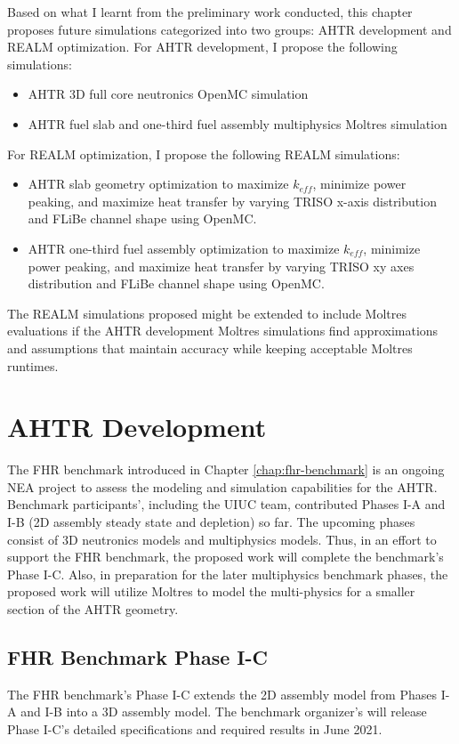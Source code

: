 Based on what I learnt from the preliminary work conducted, this chapter proposes 
future simulations categorized into two groups: \gls{AHTR} development and 
\gls{REALM} optimization. 
For \gls{AHTR} development, I propose the following simulations: 
\begin{itemize}
    \item \gls{AHTR} 3D full core neutronics OpenMC simulation
    \item \gls{AHTR} fuel slab and one-third fuel assembly multiphysics 
    Moltres simulation
\end{itemize}
For \gls{REALM} optimization, I propose the following \gls{REALM} simulations: 
\begin{itemize}
    \item \gls{AHTR} slab geometry optimization to maximize $k_{eff}$, 
    minimize power peaking, and maximize heat transfer by varying \gls{TRISO} 
    x-axis distribution and \gls{FLiBe} channel shape using OpenMC. 
    \item \gls{AHTR} one-third fuel assembly optimization to maximize $k_{eff}$, 
    minimize power peaking, and maximize heat transfer by varying \gls{TRISO} 
    xy axes distribution and \gls{FLiBe} channel shape using OpenMC.
\end{itemize}
The \gls{REALM} simulations proposed might be extended to include Moltres 
evaluations if the \gls{AHTR} development Moltres simulations find approximations 
and assumptions that maintain accuracy while keeping acceptable Moltres runtimes.

\section{AHTR Development}
The \gls{FHR} benchmark introduced in Chapter \ref{chap:fhr-benchmark} is an 
ongoing \gls{NEA} project to assess the modeling and simulation capabilities 
for the \gls{AHTR}. 
Benchmark participants', including the \gls{UIUC} team, contributed Phases I-A 
and I-B (2D assembly steady state and depletion) so far.  
The upcoming phases consist of 3D neutronics models and multiphysics models. 
Thus, in an effort to support the \gls{FHR} benchmark, the proposed work will 
complete the benchmark's Phase I-C.
Also, in preparation for the later multiphysics benchmark phases, the proposed 
work will utilize Moltres to model the multi-physics for a smaller section of 
the \gls{AHTR} geometry. 

\subsection{\gls{FHR} Benchmark Phase I-C}
The \gls{FHR} benchmark's Phase I-C extends the 2D assembly model from Phases 
I-A and I-B into a 3D assembly model. 
The benchmark organizer's will release Phase I-C's detailed specifications and 
required results in June 2021.

